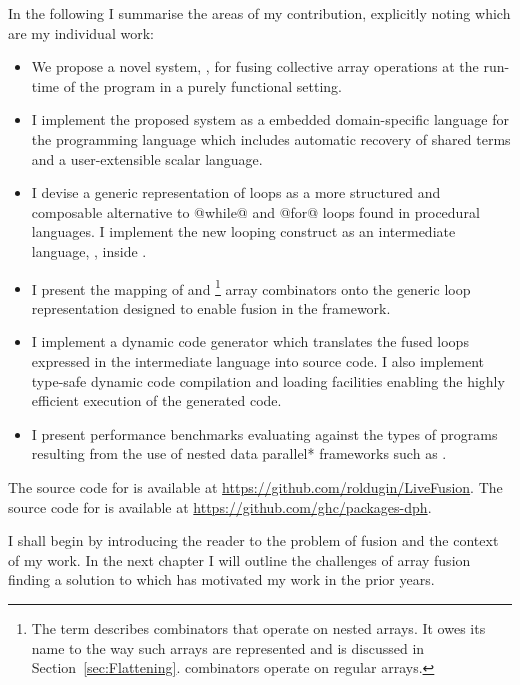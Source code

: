 \documentclass[preamble.tex]{subfiles}
\begin{document}
In the following I summarise the areas of my contribution, explicitly noting which are my individual work:
\begin{itemize}

  \item We propose a novel system, \LiveFusion, for fusing collective array operations at the run-time of the program in a purely functional setting.

  \item I implement the proposed system as a embedded domain-specific language for the \Haskell programming language which includes automatic recovery of shared terms and a user-extensible scalar language.

  \item I devise a generic representation of loops as a more structured and composable alternative to @while@ and @for@ loops found in procedural languages. I implement the new looping construct as an intermediate language, \Loop, inside \LiveFusion.

  \item I present the mapping of  and \footnote{The term  describes combinators that operate on nested arrays. It owes its name to the way such arrays are represented and is discussed in Section~\ref{sec:Flattening}.  combinators operate on regular arrays.} array combinators onto the generic loop representation designed to enable fusion in the  framework.

  \item I implement a dynamic code generator which translates the fused loops expressed in the intermediate \Loop language into \Haskell source code. I also implement type-safe dynamic code compilation and loading facilities enabling the highly efficient execution of the generated code.

  \item I present performance benchmarks evaluating \LiveFusion against the types of programs resulting from the use of \*nested data parallel* frameworks such as .

\end{itemize}

The source code for \LiveFusion is available at \url{https://github.com/roldugin/LiveFusion}. The source code for  is available at \url{https://github.com/ghc/packages-dph}.

I shall begin by introducing the reader to the problem of fusion and the context of my work. In the next chapter I will outline the challenges of array fusion finding a solution to which has motivated my work in the prior years.





\IfNotCompilingAll{}
\end{document}
